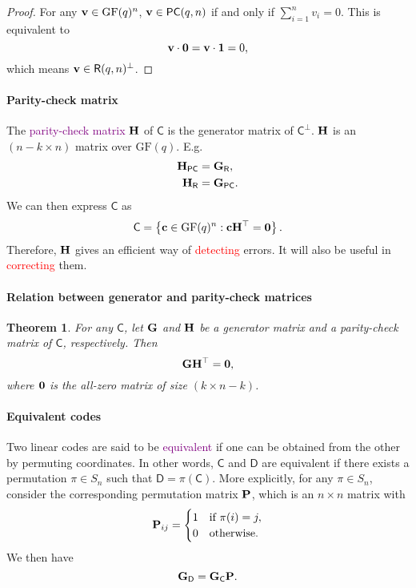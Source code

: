 \documentclass[a4paper, 11pt, openany]{book}
\numberwithin{equation}{section}
\theoremstyle{plain}
\newtheorem{theorem}	[equation]	{Theorem}
\theoremstyle{definition}
\newcommand{\GF}{\mathrm{GF}}
\newcommand{\Important}[1]{\textcolor{red}{#1}}
\newcommand{\Define}[1]{\textcolor{purple}{#1}}
\newcommand{\code}[1]{\mathsf{#1}}
\newcommand{\Paritycheck}           {\code{PC}}
\newcommand{\Repetition}            {\code{R}}
\begin{document}
\begin{proof}
For any ${\bf v} \in \GF(q)^n$, ${\bf v} \in \Paritycheck(q,n)$ if and only if $\sum_{i=1}^n v_i = 0$. This is equivalent to 
\[
    {\bf v} \cdot {\bf 0} = {\bf v} \cdot {\bf 1} = 0,
\]
which means ${\bf v} \in \Repetition(q,n)^\perp$.
\end{proof}

\paragraph{Parity-check matrix}
The \Define{parity-check matrix} ${\bf H}$ of $\code{C}$ is the generator matrix of $\code{C}^\perp$. ${\bf H}$ is an $(n-k \times n)$ matrix over $\GF(q)$. E.g.
\begin{align*}
	{\bf H}_{\Paritycheck} &= {\bf G}_{\Repetition},\\
	{\bf H}_{\Repetition} &= {\bf G}_{\Paritycheck}.
\end{align*}
We can then express $\code{C}$ as 
\[
	\code{C} = \left\{{\bf c} \in \GF(q)^n: {\bf c}{\bf H}^\top = {\bf 0} \right\}.
\]
Therefore, ${\bf H}$ gives an efficient way of \Important{detecting} errors. It will also be useful in \Important{correcting} them.


\paragraph{Relation between generator and parity-check matrices}
\begin{theorem}
For any $\code{C}$, let ${\bf G}$ and ${\bf H}$ be a generator matrix and a parity-check matrix of $\code{C}$, respectively. Then
\[
	{\bf G}{\bf H}^\top = {\bf 0},
\]
where ${\bf 0}$ is the all-zero matrix of size $(k \times n-k)$.
\end{theorem}


\paragraph{Equivalent codes}
Two linear codes are said to be \Define{equivalent} if one can be obtained from the other by permuting coordinates. In other words, $\code{C}$ and $\code{D}$ are equivalent if there exists a permutation $\pi \in S_n$ such that $\code{D} = \pi(\code{C})$. More explicitly, for any $\pi \in S_n$, consider the corresponding permutation matrix ${\bf P}$, which is an $n \times n$ matrix with
\[
	{\bf P}_{ij} = \begin{cases}
	1 &\text{if } \pi(i) = j,\\
	0 &\text{otherwise.}
	\end{cases}
\]
We then have
\[
	{\bf G}_\code{D} = {\bf G}_\code{C} {\bf P}.
\]
\end{document}
